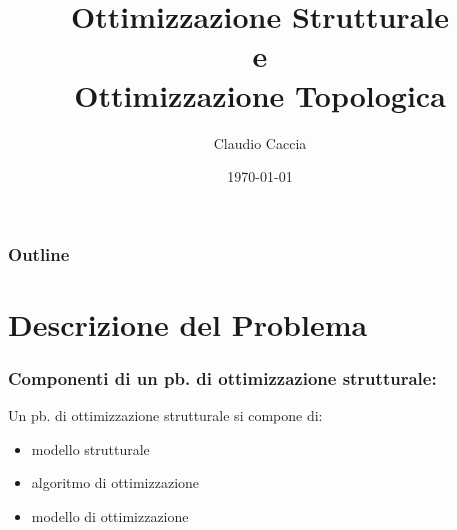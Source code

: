\documentclass{beamer}
\title[Structural Optimization]{Ottimizzazione Strutturale \\
	e \\
	Ottimizzazione Topologica } %
\author{Claudio Caccia} %
\institute[PSA] %
{
Progetto di Strutture Aerospaziali \\ %
\medskip
\textit{Politecnico di Milano} %
}
\date{\today} %
\begin{document}
\begin{frame}
\titlepage %
\end{frame}

\begin{frame}
\frametitle{Outline} %
\tableofcontents
\end{frame}


\section{Descrizione del Problema} %


\begin{frame}
	\frametitle{Componenti di un pb. di ottimizzazione strutturale:}
	Un pb. di ottimizzazione strutturale si compone di: 
	\begin{itemize}
		\item modello strutturale
		\item algoritmo di ottimizzazione
		\item modello di ottimizzazione
	\end{itemize}
\end{frame}
\end{document}
